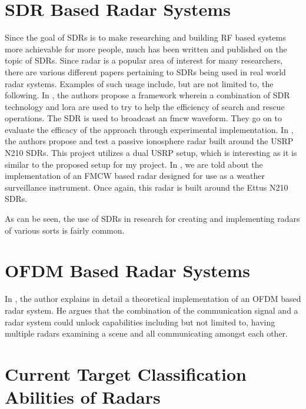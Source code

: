 \documentclass[11pt]{report}
\begin{document}
\section{SDR Based Radar Systems}
Since the goal of SDRs is to make researching and building RF based systems more achievable for more people, much has been written and published on the topic of SDRs. Since radar is a popular area of interest for many researchers, there are various different papers pertaining to SDRs being used in real world radar systems. Examples of such usage include, but are not limited to, the following. In \cite{A_Framework_for_Improving_Search_and_Rescue_Operations_Through_SDR-Based_FMCW_Radar_and_LPWAN_Technology}, the authors propose a framework wherein a combination of SDR technology and \gls{lora} are used to try to help the efficiency of search and rescue operations. The SDR is used to broadcast an \gls{fmcw} waveform. They go on to evaluate the efficacy of the approach through experimental implementation. In \cite{Passive_ionospheric_radar_builds_with_USRP_N210}, the authors propose and test a passive ionosphere radar built around the USRP N210 SDRs. This project utilizes a dual USRP setup, which is interesting as it is similar to the proposed setup for my project. In \cite{GNU_Radio_based_software-defined_FMCW_radar_for_weather_surveillance_application}, we are told about the implementation of an FMCW based radar designed for use as a weather surveillance instrument. Once again, this radar is built around the Ettus N210 SDRs.

As can be seen, the use of SDRs in research for creating and implementing radars of various sorts is fairly common.



\section{OFDM Based Radar Systems}
In \cite{tigrek_thesis}, the author explains in detail a theoretical implementation of an OFDM based radar system. He argues that the combination of the communication signal and a radar system could unlock capabilities including but not limited to, having multiple radars examining a scene and all communicating amongst each other. 





\section{Current Target Classification Abilities of Radars}
\end{document}
